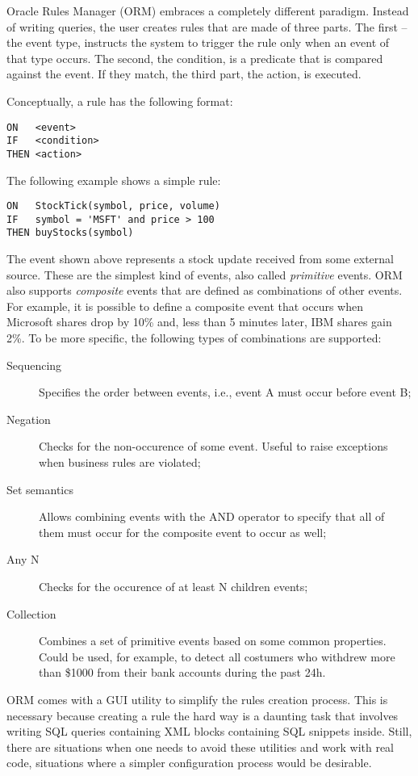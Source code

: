 \documentclass{report}
\begin{document}
Oracle Rules Manager (ORM) embraces a completely different paradigm. Instead of writing queries, the user creates rules that are made of three parts. The first -- the event type, instructs the system to trigger the rule only when an event of that type occurs. The second, the condition, is a predicate that is compared against the event. If they match, the third part, the action, is executed.

Conceptually, a rule has the following format:

\begin{verbatim}
ON   <event>
IF   <condition>
THEN <action>
\end{verbatim}

The following example shows a simple rule:

\begin{verbatim}
ON   StockTick(symbol, price, volume)
IF   symbol = 'MSFT' and price > 100
THEN buyStocks(symbol)
\end{verbatim}

The event shown above represents a stock update received from some external source. These are the simplest kind of events, also called \emph{primitive} events. ORM also supports \emph{composite} events that are defined as combinations of other events. For example, it is possible to define a composite event that occurs when Microsoft shares drop by 10\% and, less than 5 minutes later, IBM shares gain 2\%. To be more specific, the following types of combinations are supported:
\begin{description}
\item [Sequencing] Specifies the order between events, i.e., event A must occur before event B;
\item [Negation] Checks for the non-occurence of some event. Useful to raise exceptions when business rules are violated;
\item [Set semantics] Allows combining events with the AND operator to specify that all of them must occur for the composite event to occur as well;
\item [Any N] Checks for the occurence of at least N children events;
\item [Collection] Combines a set of primitive events based on some common properties. Could be used, for example, to detect all costumers who withdrew more than \$1000 from their bank accounts during the past 24h.
\end{description}

ORM comes with a GUI utility to simplify the rules creation process. This is necessary because creating a rule the hard way is a daunting task that involves writing SQL queries containing XML blocks containing SQL snippets inside. Still, there are situations when one needs to avoid these utilities and work with real code, situations where a simpler configuration process would be desirable.
\end{document}
